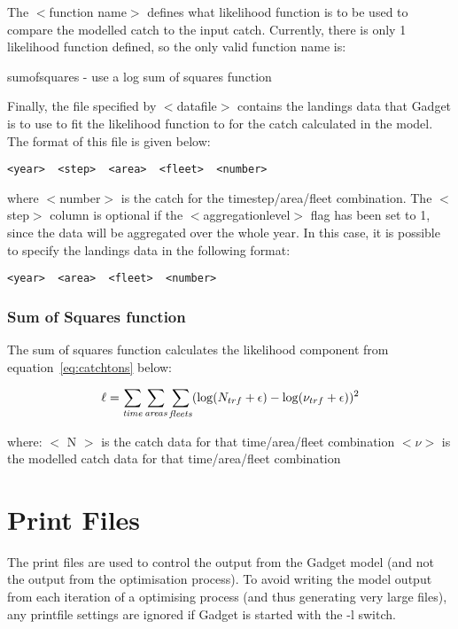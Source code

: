 \documentclass [a4paper, 10pt]{book}
\begin{document}
\bigskip
The $<$function name$>$ defines what likelihood function is to be used to compare the modelled catch to the input catch.  Currently, there is only 1 likelihood function defined, so the only valid function name is:

\bigskip
sumofsquares - use a log sum of squares function

\bigskip
Finally, the file specified by $<$datafile$>$ contains the landings data that Gadget is to use to fit the likelihood function to for the catch calculated in the model.  The format of this file is given below:

{\small\begin{verbatim}
<year>  <step>  <area>  <fleet>  <number>
\end{verbatim}}

where $<$number$>$ is the catch for the timestep/area/fleet combination.  The $<$step$>$ column is optional if the $<$aggregationlevel$>$ flag has been set to 1, since the data will be aggregated over the whole year.  In this case, it is possible to specify the landings data in the following format:

{\small\begin{verbatim}
<year>  <area>  <fleet>  <number>
\end{verbatim}}

\subsection{Sum of Squares function}
The sum of squares function calculates the likelihood component from equation~\ref{eq:catchtons} below:

\begin{equation}\label{eq:catchtons}
\ell = \sum_{\it time}\sum_{\it areas}\sum_{\it fleets} (\log(N_{trf} + \epsilon) - \log(\nu_{trf} + \epsilon))^2
\end{equation}

where:\newline
$<$ N $>$ is the catch data for that time/area/fleet combination\newline
$<\nu>$ is the modelled catch data for that time/area/fleet combination

\chapter{Print Files}\label{chap:print}
The print files are used to control the output from the Gadget model (and not the output from the optimisation process).  To avoid writing the model output from each iteration of a optimising process (and thus generating very large files), any printfile settings are ignored if Gadget is started with the -l switch.
\end{document}
